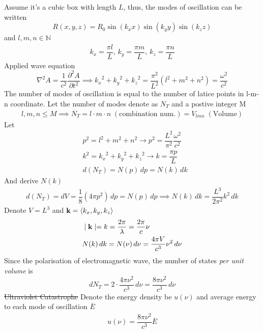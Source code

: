 \documentclass[12pt, a4paper]{article}
\begin{document}
\begin{CJK*}{UTF8}{bsmi}
Assume it's a cubic box with length \(L\), thus, the modes of oscillation can be written
\begin{equation}
    R(x,y,z) = R_0 \sin{(k_x x)}\sin{(k_y y)}\sin{(k_z z)}
\end{equation}
and $l,m,n \in \mathbb{N}$
\begin{align}
    k_x =\dfrac{\pi l}{L}, \, k_y = \dfrac{\pi m }{L},\, k_z = \dfrac{\pi n}{L}
\end{align}
Applied wave equation
\begin{equation}
    \nabla^2 A  = \dfrac{1}{c^2}\dfrac{\partial^2 A}{\partial t^2}\implies {k_x}^2+{k_y}^2+{k_z}^2=\dfrac{\pi^2}{L^2}(l^2+m^2+n^2)= \dfrac{\omega^2}{c^2}
\end{equation}
The number of modes of oscillation is equal to the number of latice points in l-m-n coordinate. Let the number of modes denote as \(N_T\) and a postive integer M
\begin{align}
    l,m,n \leq M \implies N_T = l\cdot m\cdot n \;(\text{combination num.})= V_{lmn}\;(\text{Volume})
\end{align}
Let 
\begin{align}
    &p^2 = l^2 + m^2 + n^2 \xrightarrow{} p^2 =\dfrac{L^2}{\pi^2}\dfrac{\omega^2}{c^2}\\
    &k^2 = {k_x}^2 +{k_y}^2 + {k_z}^2 \xrightarrow{} k=\dfrac{\pi p}{L}\\
    &d(N_T) = N(p)\,dp = N(k)\,dk
\end{align}
And derive $N(k)$
\begin{align}
    d(N_T) = dV = \dfrac{1}{8}(4\pi p^2)\,dp = N(p)\,dp \implies N(k)\,dk = \dfrac{L^3}{2\pi^2}k^2\,dk
\end{align}
Denote \(V = L^3\) and \(\textbf k = \langle k_x,k_y,k_z\rangle\)
\begin{align}
    &\mid\textbf k \mid=k = \dfrac{2\pi}{\lambda} = \dfrac{2\pi}{c}\nu\\
    &N(k)\,dk = N(\nu)\,d\nu = \dfrac{4\pi V}{c^3} \nu^2 \,d\nu
\end{align}
Since the polarisation of electromagnetic wave,  the number of states \emph{per unit volume} is
\begin{equation}
    dN_T = 2\cdot \dfrac{4\pi\nu^2}{c^3}\,d\nu= \dfrac{8\pi\nu^2}{c^3}\,d\nu
\end{equation}
\st{Ultraviolet Catastrophe}
Denote the energy density be \(u(\nu)\) and average energy to each mode of oscillation \(\overline{E}\)
\begin{align}
    u(\nu) = \dfrac{8\pi \nu^2}{c^3}\overline{E}

\end{align}
\end{CJK*}
\end{document}
